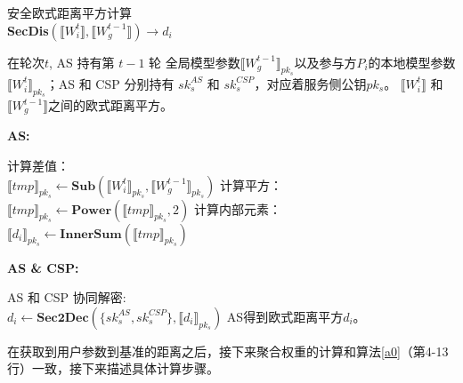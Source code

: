 \begin{algorithm}[htbp]
	\caption{安全欧式距离平方计算\\ \textbf{SecDis}$(\llbracket W_i^{t}\rrbracket, \llbracket W_g^{t-1}\rrbracket)\rightarrow d_i$}
	\label{a2}
	\begin{algorithmic}
		\REQUIRE 在轮次$t$, AS 持有第 $t-1$ 轮 全局模型参数$\llbracket W_g^{t-1} \rrbracket_{pk_s}$以及参与方$P_i$的本地模型参数 $\llbracket W_i^{t} \rrbracket_{pk_s}$；AS 和 CSP 分别持有 $sk_{s}^{AS}$ 和 $sk_{s}^{CSP}$，对应着服务侧公钥$pk_s$。
		\ENSURE $\llbracket W_i^{t}\rrbracket$ 和 $\llbracket W_g^{t-1}\rrbracket$之间的欧式距离平方。
	\end{algorithmic}
	\textbf{AS:}
	\begin{algorithmic}[1]
		\STATE 计算差值：\\$\llbracket tmp\rrbracket_{pk_s}\leftarrow {\textbf{Sub}}(\llbracket W_i^{t} \rrbracket_{pk_s}, \llbracket W_g^{t-1} \rrbracket_{pk_s})$
		\STATE 计算平方：\\$\llbracket tmp \rrbracket_{pk_s}\leftarrow {\textbf{Power}}(\llbracket tmp\rrbracket_{pk_s}, 2)$
		\STATE 计算内部元素：\\$\llbracket d_i \rrbracket_{pk_s}\leftarrow {\textbf{InnerSum}}(\llbracket tmp \rrbracket_{pk_s})$
	\end{algorithmic}
	\textbf{AS \& CSP:}
	\begin{algorithmic}[1]
		\STATE AS 和 CSP 协同解密: \\ $d_i \leftarrow \textbf{Sec2Dec}(\{sk_{s}^{AS}, sk_{s}^{CSP}\}, \llbracket d_i \rrbracket_{pk_s})$
		\RETURN AS得到欧式距离平方$d_i$。
	\end{algorithmic}
\end{algorithm}

在获取到用户参数到基准的距离之后，接下来聚合权重的计算和算法\ref{a0}（第4-13行）一致，接下来描述具体计算步骤。

